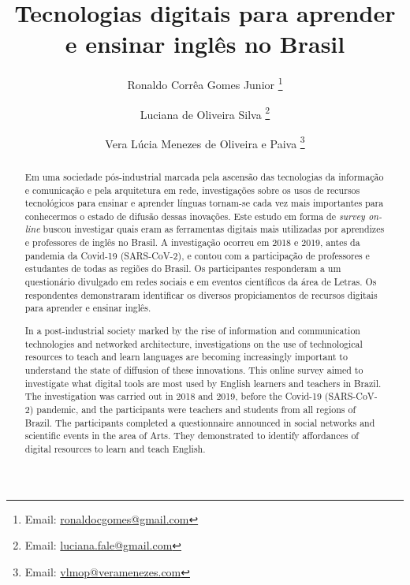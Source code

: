 \documentclass[portuguese]{textolivre}
\title{Tecnologias digitais para aprender e ensinar inglês no Brasil}
\author[1]{Ronaldo Corrêa Gomes Junior \orcid{0000-0003-4165-8629} \thanks{Email: \url{ronaldocgomes@gmail.com}}}
\author[1]{Luciana de Oliveira Silva \orcid{0000-0001-8109-2389} \thanks{Email: \url{luciana.fale@gmail.com}}}
\author[1]{Vera Lúcia Menezes de Oliveira e Paiva \orcid{0000-0001-9379-5698} \thanks{Email: \url{vlmop@veramenezes.com}}}
\affil[1]{Universidade Federal de Minas Gerais, Faculdade de Letras, Belo Horizonte, MG, Brasil.}
\begin{document}
\maketitle

\begin{polyabstract}
\begin{abstract}
Em uma sociedade pós-industrial marcada pela ascensão das tecnologias da informação e comunicação e pela arquitetura em rede, investigações sobre os usos de recursos tecnológicos para ensinar e aprender línguas tornam-se cada vez mais importantes para conhecermos o estado de difusão dessas inovações. Este estudo em forma de \textit{survey on-line} buscou investigar quais eram as ferramentas digitais mais utilizadas por aprendizes e professores de inglês no Brasil. A investigação ocorreu em 2018 e 2019, antes da pandemia da Covid-19 (SARS-CoV-2), e contou com a participação de professores e estudantes de todas as regiões do Brasil. Os participantes responderam a um questionário divulgado em redes sociais e em eventos científicos da área de Letras. Os respondentes demonstraram identificar os diversos propiciamentos de recursos digitais para aprender e ensinar inglês.

\end{abstract}

\begin{english}
\begin{abstract}
In a post-industrial society marked by the rise of information and communication technologies and networked architecture, investigations on the use of technological resources to teach and learn languages are becoming increasingly important to understand the state of diffusion of these innovations. This online survey aimed to investigate what digital tools are most used by English learners and teachers in Brazil. The investigation was carried out in 2018 and 2019, before the Covid-19 (SARS-CoV-2) pandemic, and the participants were teachers and students from all regions of Brazil. The participants completed a questionnaire announced in social networks and scientific events in the area of Arts. They demonstrated to identify affordances of digital resources to learn and teach English.

\end{abstract}
\end{english}
\end{polyabstract}
\end{document}
